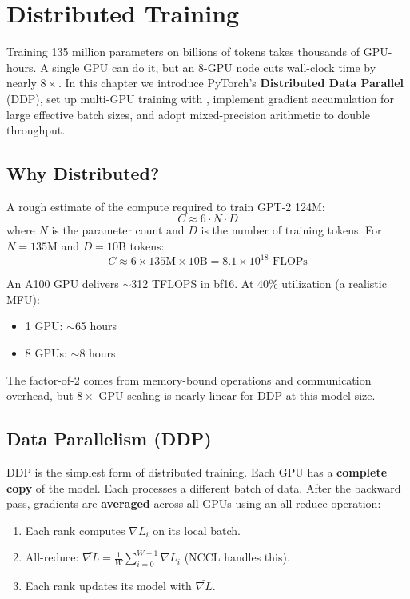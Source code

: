 \chapter{Distributed Training}
\label{ch:distributed}

Training 135 million parameters on billions of tokens takes thousands of GPU-hours.  A single GPU can do it, but an 8-GPU node cuts wall-clock time by nearly $8\times$.  In this chapter we introduce PyTorch's \textbf{Distributed Data Parallel} (DDP), set up multi-GPU training with , implement gradient accumulation for large effective batch sizes, and adopt mixed-precision arithmetic to double throughput.


\section{Why Distributed?}

A rough estimate of the compute required to train GPT-2 124M:
\[
  C \approx 6 \cdot N \cdot D
\]
where $N$ is the parameter count and $D$ is the number of training tokens.  For $N = 135$M and $D = 10$B tokens:
\[
  C \approx 6 \times 135\text{M} \times 10\text{B} = 8.1 \times 10^{18} \text{ FLOPs}
\]

An A100 GPU delivers $\sim$312 TFLOPS in bf16.  At 40\% utilization (a realistic MFU):
\begin{itemize}
  \item 1 GPU: $\sim$65 hours
  \item 8 GPUs: $\sim$8 hours
\end{itemize}

The factor-of-2 comes from memory-bound operations and communication overhead, but $8\times$ GPU scaling is nearly linear for DDP at this model size.


\section{Data Parallelism (DDP)}

DDP is the simplest form of distributed training.  Each GPU has a \textbf{complete copy} of the model.  Each processes a different batch of data.  After the backward pass, gradients are \textbf{averaged} across all GPUs using an all-reduce operation:

\begin{enumerate}
  \item Each rank computes $\nabla L_i$ on its local batch.
  \item All-reduce: $\bar{\nabla L} = \frac{1}{W} \sum_{i=0}^{W-1} \nabla L_i$ (NCCL handles this).
  \item Each rank updates its model with $\bar{\nabla L}$.
\end{enumerate}

